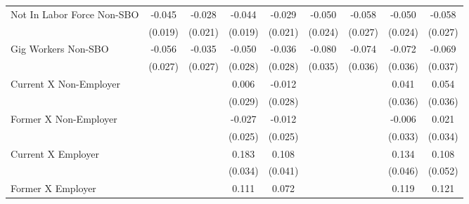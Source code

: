 {\begin{tabular}{l*{8}{c}}
Not In Labor Force Non-SBO&      -0.045\sym{*}  &      -0.028         &      -0.044\sym{*}  &      -0.029         &      -0.050\sym{*}  &      -0.058\sym{*}  &      -0.050\sym{*}  &      -0.058\sym{*}  \\
                    &     (0.019)         &     (0.021)         &     (0.019)         &     (0.021)         &     (0.024)         &     (0.027)         &     (0.024)         &     (0.027)         \\
Gig Workers Non-SBO &      -0.056\sym{*}  &      -0.035         &      -0.050         &      -0.036         &      -0.080\sym{*}  &      -0.074\sym{*}  &      -0.072\sym{*}  &      -0.069         \\
                    &     (0.027)         &     (0.027)         &     (0.028)         &     (0.028)         &     (0.035)         &     (0.036)         &     (0.036)         &     (0.037)         \\
Current X Non-Employer&                     &                     &       0.006         &      -0.012         &                     &                     &       0.041         &       0.054         \\
                    &                     &                     &     (0.029)         &     (0.028)         &                     &                     &     (0.036)         &     (0.036)         \\
Former X Non-Employer&                     &                     &      -0.027         &      -0.012         &                     &                     &      -0.006         &       0.021         \\
                    &                     &                     &     (0.025)         &     (0.025)         &                     &                     &     (0.033)         &     (0.034)         \\
Current X Employer  &                     &                     &       0.183\sym{***}&       0.108\sym{**} &                     &                     &       0.134\sym{**} &       0.108\sym{*}  \\
                    &                     &                     &     (0.034)         &     (0.041)         &                     &                     &     (0.046)         &     (0.052)         \\
Former X Employer   &                     &                     &       0.111\sym{*}  &       0.072         &                     &                     &       0.119         &       0.121         \\

\end{tabular}}
